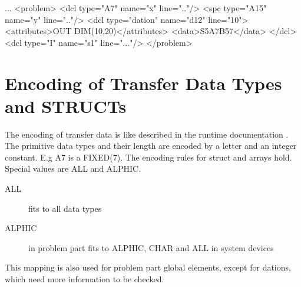 \begin{XMLCode}
...
<problem>
  <dcl type="A7" name="x" line=".."/>
  <spc type="A15" name="y" line=".."/>
  <dcl type="dation" name="d12" line="10">
    <attributes>OUT DIM(10,20)</attributes>
    <data>S5A7B57</data>
  </dcl>
  <dcl type="I" name="s1" line="..."/>
</problem>
\end{XMLCode}


\section{Encoding of Transfer Data Types and STRUCTs}
\label{encoding}
The encoding of transfer data is like described in the runtime documentation
\cite{runtime}. The primitive data types and their length are encoded 
by a letter and an integer constant. E.g A7 is a FIXED(7). The encoding rules
for struct and arrays hold. Special values are ALL and ALPHIC.

\begin{description}
\item[ALL] fits to all data types
\item[ALPHIC] in problem part fits to ALPHIC, CHAR and ALL in system devices
\end{description}

This mapping is also used for problem part global elements, except for dations,
which need more information to be checked.
